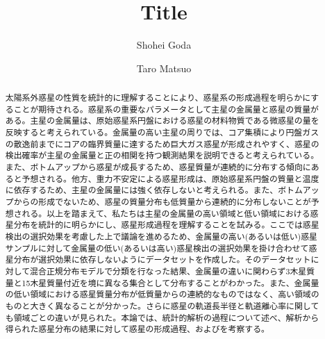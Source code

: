 \documentclass[twocolumn, dvipdfmx]{aastex62}
\begin{document}
\begin{CJK*}{UTF8}{min}

\title{Title}

\author{Shohei Goda}

\author{Taro Matsuo}


\begin{abstract}

太陽系外惑星の性質を統計的に理解することにより、惑星系の形成過程を明らかにすることが期待される。惑星系の重要なパラメータとして主星の金属量と惑星の質量がある。主星の金属量は、原始惑星系円盤における惑星の材料物質である微惑星の量を反映すると考えられている。金属量の高い主星の周りでは、コア集積により円盤ガスの散逸前までにコアの臨界質量に達するため巨大ガス惑星が形成されやすく、惑星の検出確率が主星の金属量と正の相関を持つ観測結果を説明できると考えられている。また、ボトムアップから惑星が成長するため、惑星質量が連続的に分布する傾向にあると予想される。他方、重力不安定による惑星形成は、原始惑星系円盤の質量と温度に依存するため、主星の金属量には強く依存しないと考えられる。また、ボトムアップからの形成でないため、惑星の質量分布も低質量から連続的に分布しないことが予想される。以上を踏まえて、私たちは主星の金属量の高い領域と低い領域における惑星分布を統計的に明らかにし、惑星形成過程を理解することを試みる。ここでは惑星検出の選択効果を考慮した上で議論を進めるため、金属量の高い(あるいは低い)惑星サンプルに対して金属量の低い(あるいは高い)惑星検出の選択効果を掛け合わせて惑星分布が選択効果に依存しないようにデータセットを作成した。そのデータセットに対して混合正規分布モデルで分類を行なった結果、金属量の違いに関わらず3木星質量と15木星質量付近を境に異なる集合として分布することがわかった。また、金属量の低い領域における惑星質量分布が低質量からの連続的なものではなく、高い領域のものと大きく異なることが分かった。さらに惑星の軌道長半径と軌道離心率に関しても領域ごとの違いが見られた。本論では、統計的解析の過程について述べ、解析から得られた惑星分布の結果に対して惑星の形成過程、およびを考察する。


\end{abstract}

\vspace{1cm}




\end{CJK*}
\end{document}
